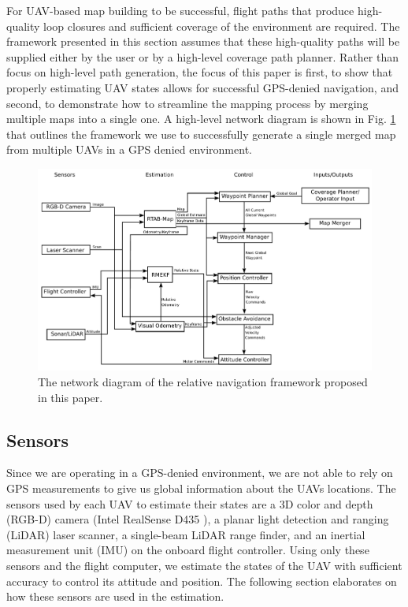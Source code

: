 \documentclass[letterpaper, 10 pt, conference]{ieeeconf}  %
\begin{document}
For UAV-based map building to be successful, flight paths that produce high-quality loop closures and sufficient coverage of the environment are required. The framework presented in this section assumes that these high-quality paths will be supplied either by the user or by a high-level coverage path planner. Rather than focus on high-level path generation, the focus of this paper is first, to show that properly estimating UAV states allows for successful GPS-denied navigation, and second, to demonstrate how to streamline the mapping process by merging multiple maps into a single one. A high-level network diagram is shown in Fig. \ref{fig:rtab_network} that outlines the framework we use to successfully generate a single merged map from multiple UAVs in a GPS denied environment.

\begin{figure}
\centering
\includegraphics[width=1.0\linewidth]{rtab_relative_nav_network}
\caption{The network diagram of the relative navigation framework proposed in this paper.}
\label{fig:rtab_network}
\end{figure}

\subsection{Sensors}

Since we are operating in a GPS-denied environment, we are not able to rely on GPS measurements to give us global information about the UAVs locations. The sensors used by each UAV to estimate their states are a 3D color and depth (RGB-D) camera (Intel RealSense D435 \cite{Intel}), a planar light detection and ranging (LiDAR) laser scanner, a single-beam LiDAR range finder, and an inertial measurement unit (IMU) on the onboard flight controller. Using only these sensors and the flight computer, we estimate the states of the UAV with sufficient accuracy to control its attitude and position. The following section elaborates on how these sensors are used in the estimation.
\end{document}
